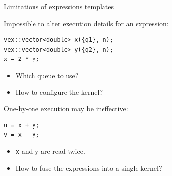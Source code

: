 \documentclass[@BEAMER_OPTIONS@]{beamer}
\newcommand{\code}[1]{\lstinline|#1|}
\begin{document}
\begin{frame}[fragile]{Limitations of expressions templates}
    \begin{exampleblock}{Impossible to alter execution details for an expression:}
        \begin{lstlisting}
vex::vector<double> x({q1}, n);
vex::vector<double> y({q2}, n);
x = 2 * y;
        \end{lstlisting}
    \end{exampleblock}
    \begin{itemize}
        \item Which queue to use?
        \item How to configure the kernel?
    \end{itemize}

    \vspace{\baselineskip}

    \begin{exampleblock}{One-by-one execution may be ineffective:}
        \begin{lstlisting}
u = x + y;
v = x - y;
        \end{lstlisting}
    \end{exampleblock}
    \begin{itemize}
        \item \code{x} and {y} are read twice.
        \item How to fuse the expressions into a single kernel?
    \end{itemize}
\end{frame}

\note{}
\end{document}
